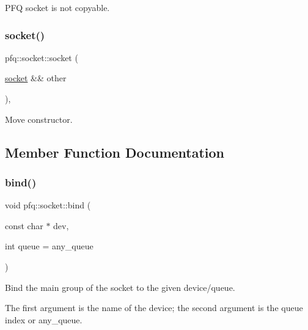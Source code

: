 P\+FQ socket is not copyable. 

\mbox{\label{classpfq_1_1socket_a1a60820551f1601beb54649d9ae48fa2}} 
\subsubsection{\texorpdfstring{socket()}{socket()}\hspace{0.1cm}{\footnotesize\ttfamily [7/7]}}
{\footnotesize\ttfamily pfq\+::socket\+::socket (\begin{DoxyParamCaption}\item[{\hyperlink{classpfq_1_1socket}{socket} \&\&}]{other }\end{DoxyParamCaption})\hspace{0.3cm}{\ttfamily [inline]}, {\ttfamily [noexcept]}}



Move constructor. 



\subsection{Member Function Documentation}
\mbox{\label{classpfq_1_1socket_a3a0fc5c70e2d2615e29d06ac55007ed3}} 
\subsubsection{\texorpdfstring{bind()}{bind()}}
{\footnotesize\ttfamily void pfq\+::socket\+::bind (\begin{DoxyParamCaption}\item[{const char $\ast$}]{dev,  }\item[{int}]{queue = {\ttfamily any\+\_\+queue} }\end{DoxyParamCaption})\hspace{0.3cm}{\ttfamily [inline]}}



Bind the main group of the socket to the given device/queue. 

The first argument is the name of the device; the second argument is the queue index or \textquotesingle{}any\+\_\+queue\textquotesingle{}. \mbox{\label{classpfq_1_1socket_a4d4d44cc68af0290e3c494dcd10b1541}} 
